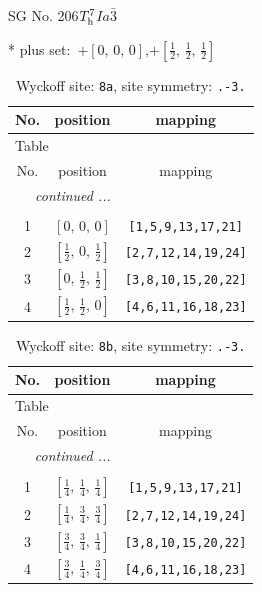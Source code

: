 \documentclass[fleqn,8pt]{jsarticle}
\begin{document}
\setcounter{MaxMatrixCols}{32}

\renewcommand{\tablename}{Table~}
\renewcommand{\figurename}{Figure~}
\begin{center}
\LARGE
SG No. 206\quad$T_{\rm h}^{7}$\quad$Ia\bar{3}$\quad[ cubic ]
\end{center}
* plus set:\,\,\,$+\left[ 0,\, 0,\, 0 \right]$,\quad $+\left[ \frac{1}{2},\, \frac{1}{2},\, \frac{1}{2} \right]$
\renewcommand{\arraystretch}{1.2}
\begin{longtable}{ccc}
\caption{Wyckoff site: {\tt 8a}, site symmetry: {\tt .-3.}}
 \\
 \hline \hline
No. & position & mapping \\ \hline \endfirsthead

\multicolumn{2}{l}{\tablename\ \thetable{}} \\
 \hline \hline
No. & position & mapping \\ \hline \endhead

 \hline \hline
\multicolumn{2}{r}{\footnotesize\it continued ...} \\ \endfoot

 \hline \hline
\multicolumn{2}{r}{} \\ \endlastfoot

1 & $\left[ 0,\, 0,\, 0 \right]$ & {\tt [1,5,9,13,17,21]} \\ \hline
2 & $\left[ \frac{1}{2},\, 0,\, \frac{1}{2} \right]$ & {\tt [2,7,12,14,19,24]} \\ \hline
3 & $\left[ 0,\, \frac{1}{2},\, \frac{1}{2} \right]$ & {\tt [3,8,10,15,20,22]} \\ \hline
4 & $\left[ \frac{1}{2},\, \frac{1}{2},\, 0 \right]$ & {\tt [4,6,11,16,18,23]} \\
\end{longtable}
\renewcommand{\arraystretch}{1.2}
\begin{longtable}{ccc}
\caption{Wyckoff site: {\tt 8b}, site symmetry: {\tt .-3.}}
 \\
 \hline \hline
No. & position & mapping \\ \hline \endfirsthead

\multicolumn{2}{l}{\tablename\ \thetable{}} \\
 \hline \hline
No. & position & mapping \\ \hline \endhead

 \hline \hline
\multicolumn{2}{r}{\footnotesize\it continued ...} \\ \endfoot

 \hline \hline
\multicolumn{2}{r}{} \\ \endlastfoot

1 & $\left[ \frac{1}{4},\, \frac{1}{4},\, \frac{1}{4} \right]$ & {\tt [1,5,9,13,17,21]} \\ \hline
2 & $\left[ \frac{1}{4},\, \frac{3}{4},\, \frac{3}{4} \right]$ & {\tt [2,7,12,14,19,24]} \\ \hline
3 & $\left[ \frac{3}{4},\, \frac{3}{4},\, \frac{1}{4} \right]$ & {\tt [3,8,10,15,20,22]} \\ \hline
4 & $\left[ \frac{3}{4},\, \frac{1}{4},\, \frac{3}{4} \right]$ & {\tt [4,6,11,16,18,23]} \\
\end{longtable}
\end{document}
